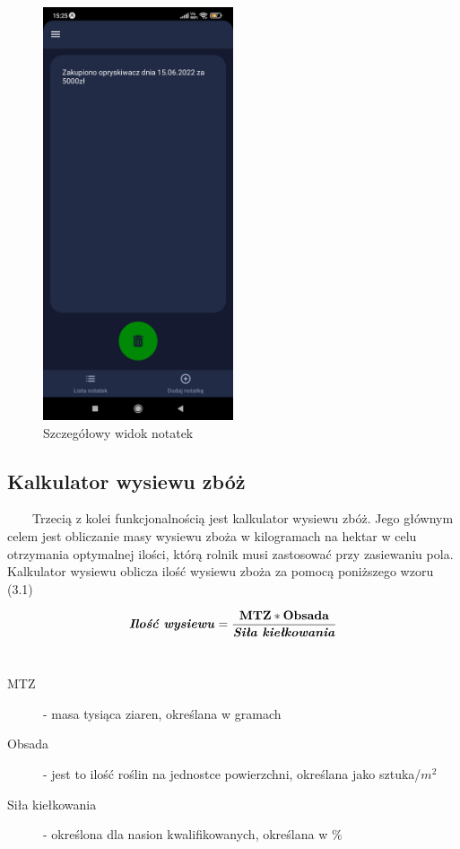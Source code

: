 \documentclass[a4paper,12pt,oneside]{book}
\begin{document}
	\begin{figure}[H]
		\centering
		\includegraphics[width=0.5\textwidth]{grafika/notatki_c.jpg}
		\caption{Szczegółowy widok notatek}
	\end{figure}
	
	\subsection{Kalkulator wysiewu zbóż}
	\ \ \ \
		Trzecią z kolei funkcjonalnością jest kalkulator wysiewu zbóż. Jego głównym celem jest obliczanie masy wysiewu zboża w kilogramach na hektar w celu otrzymania optymalnej ilości, którą rolnik musi zastosować przy zasiewaniu pola. Kalkulator wysiewu oblicza ilość wysiewu zboża za pomocą poniższego wzoru (3.1)
		
	\begin{equation}
		\textrm{\textbf{\textit{Ilość wysiewu}}} = \frac{\textbf{MTZ}*\textbf{Obsada}}{\textrm{\textit{\textbf{Siła kiełkowania}}}}
	\end{equation}
	\\
	\begin{description}
		\item[MTZ] - masa tysiąca ziaren, określana w gramach
		\item[Obsada] - jest to ilość roślin na jednostce powierzchni, określana jako sztuka/$ m^{2} $ 
		\item[Siła kiełkowania] - określona dla nasion kwalifikowanych, określana w \% 
	\end{description}
	
\end{document}
